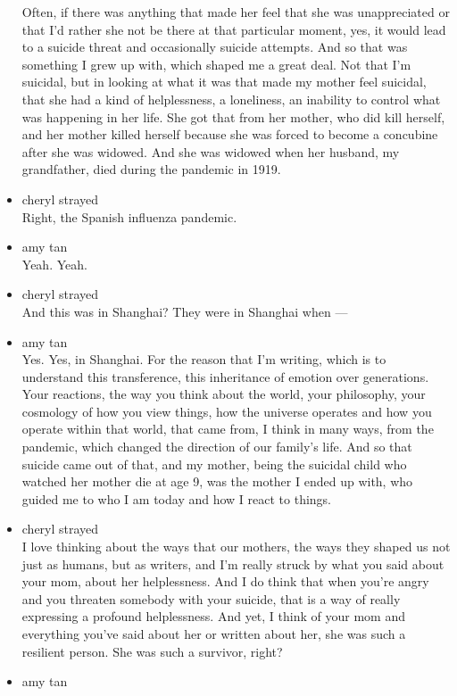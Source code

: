 \begin{itemize}
  Often, if there was anything that made her feel that she was
  unappreciated or that I'd rather she not be there at that particular
  moment, yes, it would lead to a suicide threat and occasionally
  suicide attempts. And so that was something I grew up with, which
  shaped me a great deal. Not that I'm suicidal, but in looking at what
  it was that made my mother feel suicidal, that she had a kind of
  helplessness, a loneliness, an inability to control what was happening
  in her life. She got that from her mother, who did kill herself, and
  her mother killed herself because she was forced to become a concubine
  after she was widowed. And she was widowed when her husband, my
  grandfather, died during the pandemic in 1919.
\item
  cheryl strayed\\
  Right, the Spanish influenza pandemic.
\item
  amy tan\\
  Yeah. Yeah.
\item
  cheryl strayed\\
  And this was in Shanghai? They were in Shanghai when ---
\item
  amy tan\\
  Yes. Yes, in Shanghai. For the reason that I'm writing, which is to
  understand this transference, this inheritance of emotion over
  generations. Your reactions, the way you think about the world, your
  philosophy, your cosmology of how you view things, how the universe
  operates and how you operate within that world, that came from, I
  think in many ways, from the pandemic, which changed the direction of
  our family's life. And so that suicide came out of that, and my
  mother, being the suicidal child who watched her mother die at age 9,
  was the mother I ended up with, who guided me to who I am today and
  how I react to things.
\item
  cheryl strayed\\
  I love thinking about the ways that our mothers, the ways they shaped
  us not just as humans, but as writers, and I'm really struck by what
  you said about your mom, about her helplessness. And I do think that
  when you're angry and you threaten somebody with your suicide, that is
  a way of really expressing a profound helplessness. And yet, I think
  of your mom and everything you've said about her or written about her,
  she was such a resilient person. She was such a survivor, right?
\item
  amy tan\\

\end{itemize}
